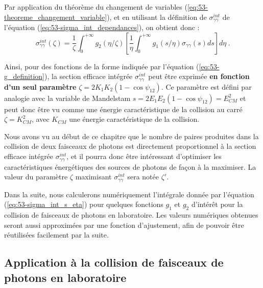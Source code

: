 \begin{refsection}
Par application du théorème du changement de variables (\ref{eq:53-theoreme_changement_variable}), et en utilisant la définition de $\sigma_{\gamma\gamma}^{int}$ de l'équation (\ref{eq:53-sigma_int_dependances}), on obtient donc :
\begin{equation}
    \sigma_{\gamma\gamma}^{int}(\zeta) = \dfrac{1}{\zeta} \int_0^{+\infty} g_2(\eta/\zeta) \left[\dfrac{1}{\eta} \int_0^{+\infty} g_1(s/\eta) \sigma_{\gamma\gamma}(s) ds \right] d\eta ~ .
    \label{eq:53-sigma_int_s_eta}
\end{equation}

Ainsi, pour des fonctions de la forme indiquée par l'équation (\ref{eq:53-g_definition}), la section efficace intégrée $\sigma_{\gamma\gamma}^{int}$ peut être exprimée \textbf{en fonction d'un seul paramètre} $\zeta=2 K_1 K_2 (1-\cos{\psi_{12}})$. Ce paramètre est défini par analogie avec la variable de Mandelstam $s=2E_1 E_2 (1-\cos\psi_{12})=E_{CM}^2$ et peut donc être vu comme une énergie caractéristique de la collision au carré $\zeta = K_{CM}^2$, avec $K_{CM}$ une énergie caractéristique de la collision. 

Nous avons vu au début de ce chapitre que le nombre de paires produites dans la collision de deux faisceaux de photons est directement proportionnel à la section efficace intégrée $\sigma_{\gamma\gamma}^{int}$, et il pourra donc être intéressant d'optimiser les caractéristiques énergétiques des sources de photons de façon à la maximiser. La valeur du paramètre $\zeta$ maximisant $\sigma_{\gamma\gamma}^{int}$ sera notée $\zeta'$.

Dans la suite, nous calculerons numériquement l'intégrale donnée par l'équation (\ref{eq:53-sigma_int_s_eta}) pour quelques fonctions $g_1$ et $g_2$ d'intérêt pour la collision de faisceaux de photons en laboratoire. Les valeurs numériques obtenues seront aussi approximées par une fonction d'ajustement, afin de pouvoir être réutilisées facilement par la suite. 

\subsection{Application à la collision de faisceaux de photons en laboratoire}


\end{refsection}
